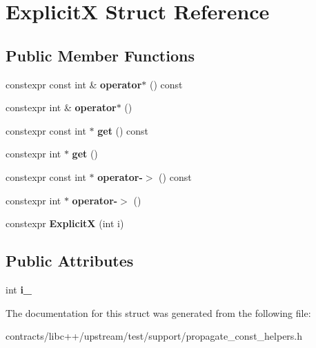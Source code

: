 \hypertarget{struct_explicit_x}{}\section{ExplicitX Struct Reference}
\label{struct_explicit_x}
\subsection*{Public Member Functions}
\begin{DoxyCompactItemize}
\item 
\mbox{\label{struct_explicit_x_a00d9d4b091c50f11c858e3235fde4377}} 
constexpr const int \& {\bfseries operator$\ast$} () const
\item 
\mbox{\label{struct_explicit_x_a25e78efbf799c17b07e6f9dc0d2d8b70}} 
constexpr int \& {\bfseries operator$\ast$} ()
\item 
\mbox{\label{struct_explicit_x_af778f3b13fbcf2737a286fbf531836b4}} 
constexpr const int $\ast$ {\bfseries get} () const
\item 
\mbox{\label{struct_explicit_x_a11b5a1b1120559034551f21fd8e4e076}} 
constexpr int $\ast$ {\bfseries get} ()
\item 
\mbox{\label{struct_explicit_x_a4b7abdefcd233e54997228083b8c4b47}} 
constexpr const int $\ast$ {\bfseries operator-\/$>$} () const
\item 
\mbox{\label{struct_explicit_x_a41eec7f7e081dd1b2832f72508781b2c}} 
constexpr int $\ast$ {\bfseries operator-\/$>$} ()
\item 
\mbox{\label{struct_explicit_x_a82c391032f97a9d98f9447d73dce5042}} 
constexpr {\bfseries ExplicitX} (int i)
\end{DoxyCompactItemize}
\subsection*{Public Attributes}
\begin{DoxyCompactItemize}
\item 
\mbox{\label{struct_explicit_x_ae76ad8da750130859b50cbf6e7168f87}} 
int {\bfseries i\+\_\+}
\end{DoxyCompactItemize}


The documentation for this struct was generated from the following file\+:\begin{DoxyCompactItemize}
\item 
contracts/libc++/upstream/test/support/propagate\+\_\+const\+\_\+helpers.\+h\end{DoxyCompactItemize}
